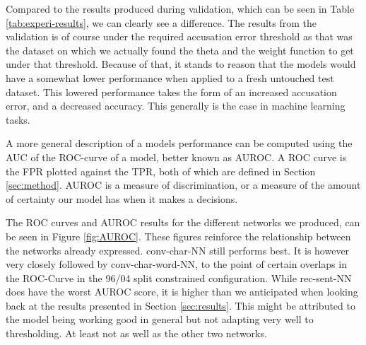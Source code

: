 Compared to the results produced during validation, which can be seen in Table
\ref{tab:experi-results}, we can clearly see a difference. The results from the
validation is of course under the required accusation error threshold as that
was the dataset on which we actually found the theta and the weight function to
get under that threshold. Because of that, it stands to reason that the models
would have a somewhat lower performance when applied to a fresh untouched test
dataset. This lowered performance takes the form of an increased accusation
error, and a decreased accuracy. This generally is the case in machine learning
tasks.

A more general description of a models performance can be computed using the
\gls{AUC} of the \gls{ROC}-curve of a model, better known as \gls{AUROC}.
A \gls{ROC} curve is the \gls{FPR} plotted against the \gls{TPR}, both of
which are defined in Section \ref{sec:method}. \gls{AUROC} is a measure of
discrimination, or a measure of the amount of certainty our model has when it
makes a decisions.

The ROC curves and AUROC results for the different networks we produced, can
be seen in Figure \ref{fig:AUROC}. These figures reinforce the relationship
between the networks already expressed. \gls{conv-char-NN} still performs
best. It is however very closely followed by \gls{conv-char-word-NN}, to the
point of certain overlaps in the ROC-Curve in the 96/04 split constrained
configuration. While \gls{rec-sent-NN} does have the worst AUROC score, it is
higher than we anticipated when looking back at the results presented in Section
\ref{sec:results}. This might be attributed to the model being working good in
general but not adapting very well to thresholding. At least not as well as the
other two networks.

